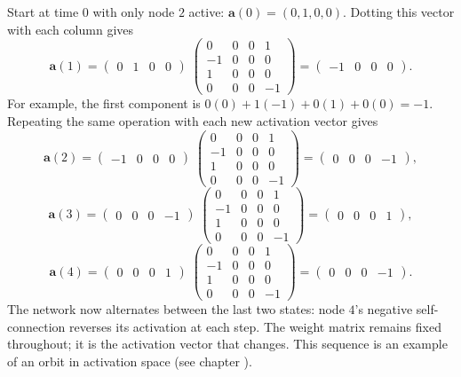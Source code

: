 Start at time 0 with only node $2$ active: $\mathbf{a}(0)=(0,1,0,0)$. Dotting this vector with each column gives
\[
\mathbf{a}(1)=
\begin{pmatrix}0&1&0&0\end{pmatrix}\;\begin{pmatrix}
0&0&0&1\\
-1&0&0&0\\
1&0&0&0\\
0&0&0&-1
\end{pmatrix}
=\begin{pmatrix}-1&0&0&0\end{pmatrix}.
\]
For example, the first component is $0(0)+1(-1)+0(1)+0(0)=-1$. Repeating the same operation with each new activation vector gives
\[
\mathbf{a}(2)=\begin{pmatrix}-1&0&0&0\end{pmatrix}\;\begin{pmatrix}
0&0&0&1\\
-1&0&0&0\\
1&0&0&0\\
0&0&0&-1
\end{pmatrix}
=\begin{pmatrix}0&0&0&-1\end{pmatrix},
\]
\[
\mathbf{a}(3)=\begin{pmatrix}0&0&0&-1\end{pmatrix}\;\begin{pmatrix}
0&0&0&1\\
-1&0&0&0\\
1&0&0&0\\
0&0&0&-1
\end{pmatrix}
=\begin{pmatrix}0&0&0&1\end{pmatrix},
\]
\[
\mathbf{a}(4)=\begin{pmatrix}0&0&0&1\end{pmatrix}\;\begin{pmatrix}
0&0&0&1\\
-1&0&0&0\\
1&0&0&0\\
0&0&0&-1
\end{pmatrix}
=\begin{pmatrix}0&0&0&-1\end{pmatrix}.
\]
The network now alternates between the last two states: node $4$'s negative self-connection reverses its activation at each step. The weight matrix remains fixed throughout; it is the activation vector that changes. This sequence is an example of an orbit in activation space (see chapter ). 

